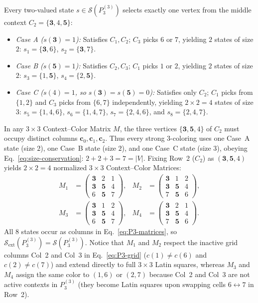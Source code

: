 \documentclass[aps,pra,reprint,superscriptaddress,longbibliography,nofootinbib,floatfix,10pt]{revtex4-2}
\theoremstyle{definition}\newtheorem{definition}[theorem]{Definition}
\theoremstyle{remark}\newtheorem{remark}[theorem]{Remark}
\newcommand{\Sc}{\mathcal S}\newcommand{\Cc}{\mathcal C}
\begin{document}
Every two-valued state $s\in\Sc(P_3^{(3)})$ selects exactly one vertex from the middle context $C_2=\{\mathbf{3},4,\mathbf{5}\}$:
\begin{itemize}
\item \emph{Case A ($s(\mathbf{3})=1$):} Satisfies $C_1,C_2$; $C_3$ picks $6$ or $7$, yielding $2$ states of size $2$: $s_1=\{\mathbf{3},6\}$, $s_2=\{\mathbf{3},7\}$.
\item \emph{Case B ($s(\mathbf{5})=1$):} Satisfies $C_2,C_3$; $C_1$ picks $1$ or $2$, yielding $2$ states of size $2$: $s_3=\{1,\mathbf{5}\}$, $s_4=\{2,\mathbf{5}\}$.
\item \emph{Case C ($s(4)=1$, so $s(\mathbf{3})=s(\mathbf{5})=0$):} Satisfies only $C_2$; $C_1$ picks from $\{1,2\}$ and $C_3$ picks from $\{6,7\}$ independently, yielding $2\times 2=4$ states of size $3$: $s_5=\{1,4,6\}$, $s_6=\{1,4,7\}$, $s_7=\{2,4,6\}$, and $s_8=\{2,4,7\}$.
\end{itemize}
In any $3\times 3$ Context--Color Matrix $M$, the three vertices $\{\mathbf{3},\mathbf{5},4\}$ of $C_2$ must occupy distinct columns $\mathbf{c}_0,\mathbf{c}_1,\mathbf{c}_2$. Thus every strong $3$-coloring uses one Case~A state (size $2$), one Case~B state (size $2$), and one Case~C state (size $3$), obeying Eq.~\eqref{eq:size-conservation}: $2+2+3=7=|V|$. Fixing Row~2 ($C_2$) as $(\mathbf{3},\mathbf{5},4)$ yields $2\times 2=4$ normalized $3\times 3$ Context--Color Matrices:
\begin{equation}\label{eq:P3-matrices}
\begin{aligned}
M_1&=\begin{pmatrix}\mathbf{3}&2&1\\\mathbf{3}&\mathbf{5}&4\\6&\mathbf{5}&7\end{pmatrix},&
M_2&=\begin{pmatrix}\mathbf{3}&1&2\\\mathbf{3}&\mathbf{5}&4\\7&\mathbf{5}&6\end{pmatrix},\\[4pt]
M_3&=\begin{pmatrix}\mathbf{3}&1&2\\\mathbf{3}&\mathbf{5}&4\\6&\mathbf{5}&7\end{pmatrix},&
M_4&=\begin{pmatrix}\mathbf{3}&2&1\\\mathbf{3}&\mathbf{5}&4\\7&\mathbf{5}&6\end{pmatrix}.
\end{aligned}
\end{equation}
All $8$ states occur as columns in Eq.~\eqref{eq:P3-matrices}, so $\Sc_{\mathrm{ext}}(P_3^{(3)})=\Sc(P_3^{(3)})$. Notice that $M_1$ and $M_2$ respect the inactive grid columns Col~2 and Col~3 in Eq.~\eqref{eq:P3-grid} ($c(1)\neq c(6)$ and $c(2)\neq c(7)$) and extend directly to full $3\times 3$ Latin squares, whereas $M_3$ and $M_4$ assign the same color to $(1,6)$ or $(2,7)$ because Col~2 and Col~3 are not active contexts in $P_3^{(3)}$ (they become Latin squares upon swapping cells $6\leftrightarrow 7$ in Row~2).
\end{document}
